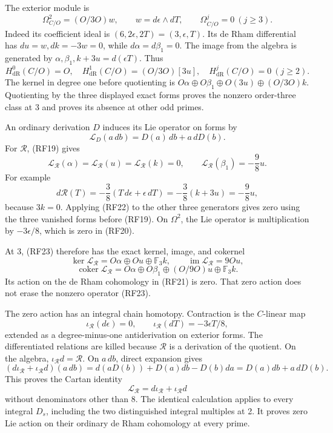 \documentclass[
  10pt,
]{article}
\begin{document}
The exterior module is \[
\Omega^2_{C/O}=(O/3O)w,\qquad w=d\epsilon\wedge dT,\qquad
\Omega^j_{C/O}=0\ (j\ge3).
\tag{RF20}
\] Indeed its coefficient ideal is \((6,2\epsilon,2T)=(3,\epsilon,T)\).
Its de Rham differential has \(du=w,dk=-3w=0\), while
\(d\alpha=d\beta_1=0\). The image from the algebra is generated by
\(\alpha,\beta_1,k+3u=d(\epsilon T)\). Thus \[
H^0_{\mathrm{dR}}(C/O)=O,\quad
H^1_{\mathrm{dR}}(C/O)=(O/3O)[3u],\quad
H^j_{\mathrm{dR}}(C/O)=0\ (j\ge2).
\tag{RF21}
\] The kernel in degree one before quotienting is
\(O\alpha\oplus O\beta_1\oplus O(3u)\oplus(O/3O)k\). Quotienting by the
three displayed exact forms proves the nonzero order-three class at 3
and proves its absence at other odd primes.

An ordinary derivation \(D\) induces its Lie operator on forms by \[
\mathcal L_D(a\,db)=D(a)\,db+a\,dD(b).
\tag{RF22}
\] For \(\mathcal R\), (RF19) gives \[
\mathcal L_{\mathcal R}(\alpha)
=\mathcal L_{\mathcal R}(u)
=\mathcal L_{\mathcal R}(k)=0,\qquad
\mathcal L_{\mathcal R}(\beta_1)=-\frac98u.
\tag{RF23}
\] For example \[
d\mathcal R(T)
=-\frac38(T\,d\epsilon+\epsilon\,dT)
=-\frac38(k+3u)=-\frac98u,
\] because \(3k=0\). Applying (RF22) to the other three generators gives
zero using the three vanished forms before (RF19). On \(\Omega^2\), the
Lie operator is multiplication by \(-3\epsilon/8\), which is zero in
(RF20).

At 3, (RF23) therefore has the exact kernel, image, and cokernel \[
\ker\mathcal L_{\mathcal R}
=O\alpha\oplus Ou\oplus\mathbb F_3k,\qquad
\operatorname{im}\mathcal L_{\mathcal R}=9Ou,
\] \[
\operatorname{coker}\mathcal L_{\mathcal R}
=O\alpha\oplus O\beta_1\oplus(O/9O)u\oplus\mathbb F_3k.
\tag{RF24}
\] Its action on the de Rham cohomology in (RF21) is zero. That zero
action does not erase the nonzero operator (RF23).

The zero action has an integral chain homotopy. Contraction is the
\(C\)-linear map \[
\iota_{\mathcal R}(d\epsilon)=0,\qquad
\iota_{\mathcal R}(dT)=-3\epsilon T/8,
\] extended as a degree-minus-one antiderivation on exterior forms. The
differentiated relations are killed because \(\mathcal R\) is a
derivation of the quotient. On the algebra,
\(\iota_{\mathcal R}d=\mathcal R\). On \(a\,db\), direct expansion gives
\[
(d\iota_{\mathcal R}+\iota_{\mathcal R}d)(a\,db)
=d(aD(b))+D(a)db-D(b)da
=D(a)db+a\,dD(b).
\] This proves the Cartan identity \[
\mathcal L_{\mathcal R}=d\iota_{\mathcal R}+\iota_{\mathcal R}d
\tag{RF25}
\] without denominators other than 8. The identical calculation applies
to every integral \(D_s\), including the two distinguished integral
multiples at 2. It proves zero Lie action on their ordinary de Rham
cohomology at every prime.
\end{document}
